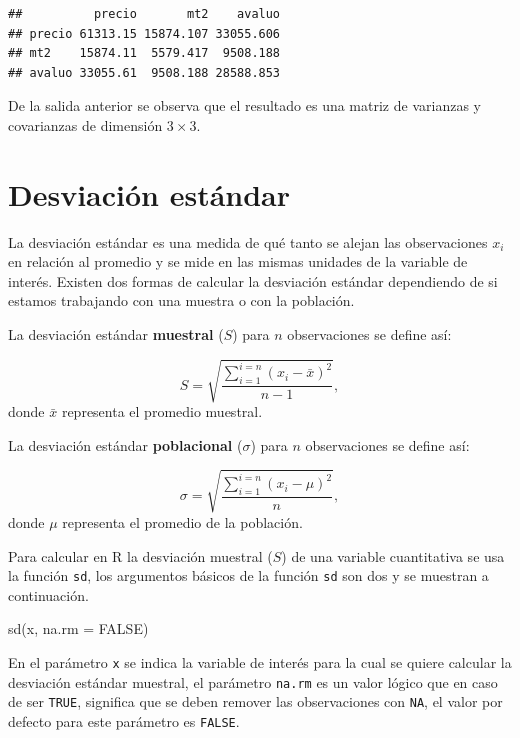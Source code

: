 \documentclass[
]{book}
\makeatletter
\newenvironment{Shaded}{\begin{snugshade}}{\end{snugshade}}
\newcommand{\AttributeTok}[1]{\textcolor[rgb]{0.77,0.63,0.00}{#1}}
\newcommand{\ConstantTok}[1]{\textcolor[rgb]{0.00,0.00,0.00}{#1}}
\newcommand{\FunctionTok}[1]{\textcolor[rgb]{0.00,0.00,0.00}{#1}}
\newcommand{\NormalTok}[1]{#1}
\newenvironment{kframe}{%
\medskip{}
\setlength{\fboxsep}{.8em}
 \def\at@end@of@kframe{}%
 \ifinner\ifhmode%
  \def\at@end@of@kframe{\end{minipage}}%
  \begin{minipage}{\columnwidth}%
 \fi\fi%
 \def\FrameCommand##1{\hskip\@totalleftmargin \hskip-\fboxsep
 \colorbox{shadecolor}{##1}\hskip-\fboxsep
     \hskip-\linewidth \hskip-\@totalleftmargin \hskip\columnwidth}%
 \MakeFramed {\advance\hsize-\width
   \@totalleftmargin\z@ \linewidth\hsize
   \@setminipage}}%
 {\par\unskip\endMakeFramed%
 \at@end@of@kframe}
\renewenvironment{Shaded}{\begin{kframe}}{\end{kframe}}
\makeatother
\begin{document}
\begin{verbatim}
##          precio       mt2    avaluo
## precio 61313.15 15874.107 33055.606
## mt2    15874.11  5579.417  9508.188
## avaluo 33055.61  9508.188 28588.853
\end{verbatim}

De la salida anterior se observa que el resultado es una matriz de varianzas y covarianzas de dimensión \(3 \times 3\).

\hypertarget{desviaciuxf3n-estuxe1ndar}{%
\section{Desviación estándar}\label{desviaciuxf3n-estuxe1ndar}}

La desviación estándar es una medida de qué tanto se alejan las observaciones \(x_i\) en relación al promedio y se mide en las mismas unidades de la variable de interés. Existen dos formas de calcular la desviación estándar dependiendo de si estamos trabajando con una muestra o con la población.

La desviación estándar \textbf{muestral} (\(S\)) para \(n\) observaciones se define así:

\[
S=\sqrt{\frac{\sum_{i=1}^{i=n}(x_i-\bar{x})^2}{n-1}},
\]
donde \(\bar{x}\) representa el promedio muestral.

La desviación estándar \textbf{poblacional} (\(\sigma\)) para \(n\) observaciones se define así:

\[
\sigma=\sqrt{\frac{\sum_{i=1}^{i=n}(x_i-\mu)^2}{n}},
\]
donde \(\mu\) representa el promedio de la población.

Para calcular en R la desviación muestral (\(S\)) de una variable cuantitativa se usa la función \texttt{sd}, los argumentos básicos de la función \texttt{sd} son dos y se muestran a continuación.

\begin{Shaded}
\begin{Highlighting}[]
\FunctionTok{sd}\NormalTok{(x, }\AttributeTok{na.rm =} \ConstantTok{FALSE}\NormalTok{)}
\end{Highlighting}
\end{Shaded}

En el parámetro \texttt{x} se indica la variable de interés para la cual se quiere calcular la desviación estándar muestral, el parámetro \texttt{na.rm} es un valor lógico que en caso de ser \texttt{TRUE}, significa que se deben remover las observaciones con \texttt{NA}, el valor por defecto para este parámetro es \texttt{FALSE}.
\end{document}
